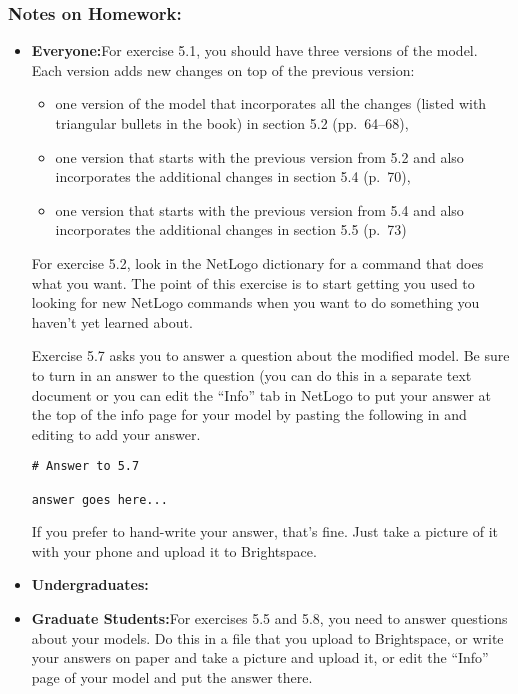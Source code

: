 \documentclass[
]{article}
\providecommand{\tightlist}{%
  \setlength{\itemsep}{0pt}\setlength{\parskip}{0pt}}
\begin{document}
\hypertarget{notes-on-homework-2}{%
\subsubsection{Notes on Homework:}\label{notes-on-homework-2}}

\begin{itemize}
\item
  \textbf{Everyone:}For exercise 5.1, you should have three versions of
  the model. Each version adds new changes on top of the previous
  version:

  \begin{itemize}
  \tightlist
  \item
    one version of the model that incorporates all the changes (listed
    with triangular bullets in the book) in section 5.2 (pp.~64--68),
  \item
    one version that starts with the previous version from 5.2 and also
    incorporates the additional changes in section 5.4 (p.~70),
  \item
    one version that starts with the previous version from 5.4 and also
    incorporates the additional changes in section 5.5 (p.~73)
  \end{itemize}

  For exercise 5.2, look in the NetLogo dictionary for a command that
  does what you want. The point of this exercise is to start getting you
  used to looking for new NetLogo commands when you want to do something
  you haven't yet learned about.

  Exercise 5.7 asks you to answer a question about the modified model.
  Be sure to turn in an answer to the question (you can do this in a
  separate text document or you can edit the ``Info'' tab in NetLogo to
  put your answer at the top of the info page for your model by pasting
  the following in and editing to add your answer.

\begin{verbatim}
# Answer to 5.7

answer goes here...
\end{verbatim}

  If you prefer to hand-write your answer, that's fine. Just take a
  picture of it with your phone and upload it to Brightspace.
\item
  \textbf{Undergraduates:}
\item
  \textbf{Graduate Students:}For exercises 5.5 and 5.8, you need to
  answer questions about your models. Do this in a file that you upload
  to Brightspace, or write your answers on paper and take a picture and
  upload it, or edit the ``Info'' page of your model and put the answer
  there.
\end{itemize}
\end{document}
